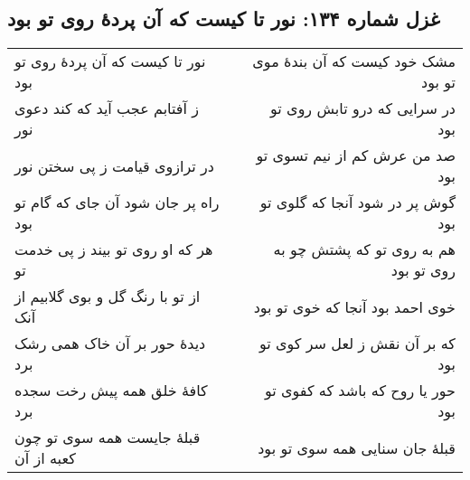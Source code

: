 \begin{center}
\section*{غزل شماره ۱۳۴: نور تا کیست که آن پردهٔ روی تو بود}
\label{sec:134}
\begin{longtable}{l p{0.5cm} r}
نور تا کیست که آن پردهٔ روی تو بود
&&
مشک خود کیست که آن بندهٔ موی تو بود
\\
ز آفتابم عجب آید که کند دعوی نور
&&
در سرایی که درو تابش روی تو بود
\\
در ترازوی قیامت ز پی سختن نور
&&
صد من عرش کم از نیم تسوی تو بود
\\
راه پر جان شود آن جای که گام تو بود
&&
گوش پر در شود آنجا که گلوی تو بود
\\
هر که او روی تو بیند ز پی خدمت تو
&&
هم به روی تو که پشتش چو به روی تو بود
\\
از تو با رنگ گل و بوی گلابیم از آنک
&&
خوی احمد بود آنجا که خوی تو بود
\\
دیدهٔ حور بر آن خاک همی رشک برد
&&
که بر آن نقش ز لعل سر کوی تو بود
\\
کافهٔ خلق همه پیش رخت سجده برد
&&
حور یا روح که باشد که کفوی تو بود
\\
قبلهٔ جایست همه سوی تو چون کعبه از آن
&&
قبلهٔ جان سنایی همه سوی تو بود
\\
\end{longtable}
\end{center}
